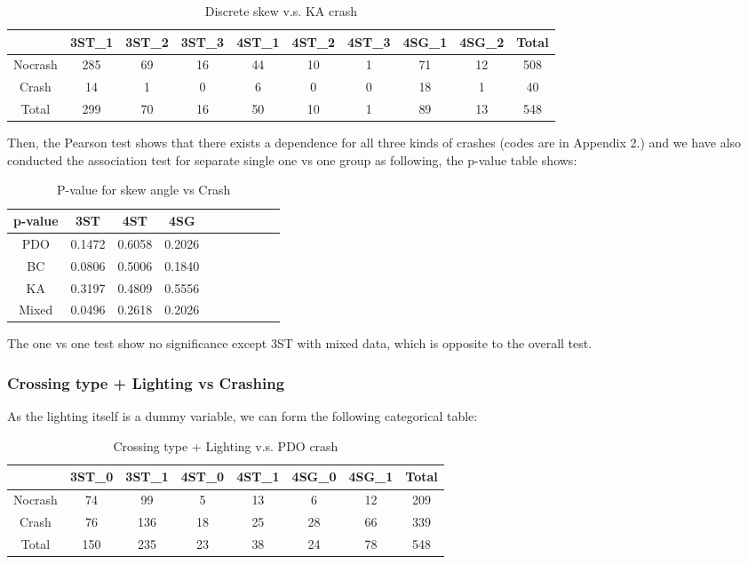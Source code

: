 \documentclass[11pt]{scrartcl} %
\begin{document}
\begin{table}[H]
\caption{Discrete skew v.s. KA crash}
\centering
\begin{tabular}{|c|c|c|c|c|c|c|c|c|c|}
\hline
      & 3ST\_1 & 3ST\_2 & 3ST\_3 & 4ST\_1 & 4ST\_2 & 4ST\_3 & 4SG\_1 & 4SG\_2 & Total \\
\hline
Nocrash &  285  & 69  & 16 & 44 & 10 &  1 &  71 & 12 &  508\\
\hline
Crash    & 14  & 1  & 0  &  6 & 0 & 0 & 18 & 1 & 40\\
\hline
Total    & 299  & 70  & 16  & 50 & 10 & 1 & 89 & 13 & 548 \\
\hline
\end{tabular}
\end{table}

Then, the Pearson test shows that there exists a dependence for all three kinds of crashes (codes are in Appendix 2.) and we have also conducted the association test for separate single one vs one group as following, the p-value table shows:

\begin{table}[H]
\caption{P-value for skew angle vs Crash}
\centering
\begin{tabular}{|c|c|c|c|c|c|c|c|c|c|}
\hline
p-value & 3ST & 4ST & 4SG  \\
\hline
PDO & 0.1472 & 0.6058 & 0.2026 \\
\hline
BC & 0.0806 & 0.5006 & 0.1840\\
\hline
KA & 0.3197  & 0.4809 & 0.5556 \\
\hline
Mixed & 0.0496 & 0.2618 & 0.2026 \\
\hline
\end{tabular}
\end{table}

The one vs one test show no significance except 3ST with mixed data, which is opposite to the overall test.


\subsubsection{Crossing type + Lighting vs Crashing}

As the lighting itself is a dummy variable, we can form the following categorical table:

\begin{table}[H]
\caption{Crossing type + Lighting v.s. PDO crash}
\centering
\begin{tabular}{|c|c|c|c|c|c|c|c|}
\hline
      & 3ST\_0 & 3ST\_1 & 4ST\_0 & 4ST\_1 & 4SG\_0 & 4SG\_1 & Total \\
\hline
Nocrash & 74 & 99 & 5 & 13 & 6 & 12 & 209\\
\hline
Crash    & 76  & 136  & 18 & 25 & 28 & 66 & 339\\
\hline
Total    & 150  & 235  & 23  & 38 & 24 & 78 & 548 \\
\hline
\end{tabular}
\end{table}
\end{document}
